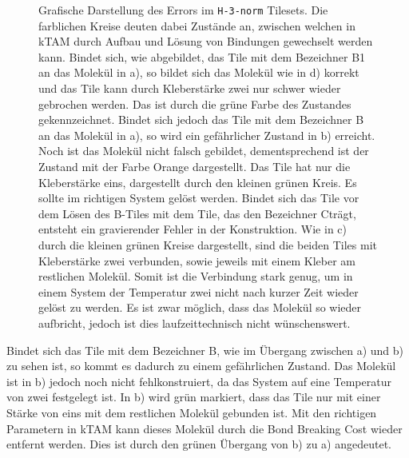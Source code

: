 \begin{figure}
    \caption[Errors im \texttt{H-3-norm} Tileset]{Grafische Darstellung des Errors im \texttt{H-3-norm} Tilesets. Die farblichen Kreise deuten dabei Zustände an, zwischen welchen in kTAM durch Aufbau und Lösung von Bindungen gewechselt werden kann. Bindet sich, wie abgebildet, das Tile mit dem Bezeichner \glqq B1\grqq\, an das Molekül in a), so bildet sich das Molekül wie in d) korrekt und das Tile kann durch Kleberstärke zwei nur schwer wieder gebrochen werden. Das ist durch die grüne Farbe des Zustandes gekennzeichnet. Bindet sich jedoch das Tile mit dem Bezeichner \glqq B\grqq\, an das Molekül in a), so wird ein gefährlicher Zustand in b) erreicht. Noch ist das Molekül nicht falsch gebildet, dementsprechend ist der Zustand mit der Farbe Orange dargestellt. Das Tile hat nur die Kleberstärke eins, dargestellt durch den kleinen grünen Kreis. Es sollte im richtigen System gelöst werden. Bindet sich das Tile vor dem Lösen des B-Tiles mit dem Tile, das den Bezeichner \glqq C\grqq trägt, entsteht ein gravierender Fehler in der Konstruktion. Wie in c) durch die kleinen grünen Kreise dargestellt, sind die beiden Tiles mit Kleberstärke zwei verbunden, sowie jeweils mit einem Kleber am restlichen Molekül. Somit ist die Verbindung stark genug, um in einem System der Temperatur zwei nicht nach kurzer Zeit wieder gelöst zu werden. Es ist zwar möglich, dass das Molekül so wieder aufbricht, jedoch ist dies laufzeittechnisch nicht wünschenswert.}
    \label{fig:H3errors}
\end{figure}

Bindet sich das Tile mit dem Bezeichner \glqq B\grqq, wie im Übergang zwischen a) und b) zu sehen ist, so kommt es dadurch zu einem gefährlichen Zustand. Das Molekül ist in b) jedoch noch nicht fehlkonstruiert, da das System auf eine Temperatur von zwei festgelegt ist. In b) wird grün markiert, dass das Tile nur mit einer Stärke von eins mit dem restlichen Molekül gebunden ist. Mit den richtigen Parametern in kTAM kann dieses Molekül durch die Bond Breaking Cost wieder entfernt werden. Dies ist durch den grünen Übergang von b) zu a) angedeutet. 

